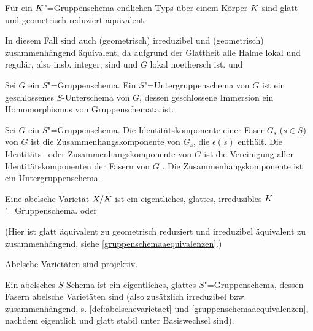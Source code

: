 \documentclass[german]{scrreprt}
\begin{document}
\begin{Definition}[$S$"=Gruppenschema]
  \begin{Bemerkung}\label{gruppenschemaaequivalenzen}
    Für ein $K$"=Gruppenschema endlichen Typs über einem Körper $K$
    sind glatt und geometrisch reduziert äquivalent.
    \cite[8.5, Excercise 11]{bosch}
    
    In diesem Fall sind auch (geometrisch) irreduzibel und (geometrisch)
    zusammenhängend äquivalent, da aufgrund der Glattheit alle Halme
    lokal und regulär, also insb. integer, sind und $G$ lokal noethersch
    ist.
    \cite[s.][Exercise 3.16]{wedhorn} und \cite[Corollary 16.51]{wedhorn}
  \end{Bemerkung}
\end{Definition}

\begin{Definition}[Untergruppenschema]
  Sei $G$ ein $S$"=Gruppenschema.
  Ein $S$"=Untergruppenschema von $G$ ist ein geschlossenes
  $S$-Unterschema von $G$, dessen geschlossene Immersion ein
  Homomorphismus von Gruppenschemata ist.
  \cite[vgl.][Definition 4.45]{wedhorn}
\end{Definition}

\begin{Definition}[Identitätskomponente]
  Sei $G$ ein $S$"=Gruppenschema.
  Die Identitätskomponente einer Faser $G_s$ ($s\in S$) von $G$ ist
  die Zusammenhangskomponente von $G_s$, die $\epsilon(s)$ enthält.
  Die Identitäts-~oder Zusammenhangskomponente von $G$ ist
  die Vereinigung aller Identitätskomponenten der Fasern von $G$
  \cite[Remark IV.6.1.2]{silverman2}.
  Die Zusammenhangskomponente ist ein Untergruppenschema.
\end{Definition}


\begin{Definition}\label{def:abelschevarietaet}
  Eine abelsche Varietät $X/K$ ist ein eigentliches, glattes,
  irreduzibles $K$"=Gruppenschema.
  \cite[9.6, Definition 1]{bosch} oder \cite[Definition 16.52]{wedhorn}

  (Hier ist glatt äquivalent zu geometrisch reduziert und irreduzibel
  äquivalent zu zusammenhängend, 
  siehe \ref{gruppenschemaaequivalenzen}.)

  \begin{Bemerkung}\label{thm:abvarietaetprojektiv}
    Abelsche Varietäten sind projektiv.
    \cite[9.6, Proposition 4]{bosch}
  \end{Bemerkung}
\end{Definition}

\begin{Definition}
  Ein abelsches $S$-Schema ist ein eigentliches, glattes $S$"=Gruppenschema,
  dessen Fasern abelsche Varietäten sind 
  (also zusätzlich irreduzibel bzw. zusammenhängend,
  s. \ref{def:abelschevarietaet} und \ref{gruppenschemaaequivalenzen},
  nachdem eigentlich und glatt stabil unter Basiswechsel sind).
\end{Definition}
\end{document}
